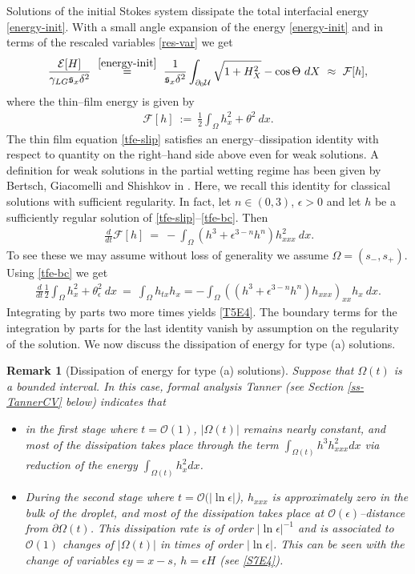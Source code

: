 \documentclass[pagesize,pdftex]{amsart}
\newtheorem{remark}[theorem]{Remark}
\newcommand{\p}{\partial}
\renewcommand{\d}{\delta}
\newcommand{\EE}{{\mathcal E}}
\newcommand{\FF}{{\mathcal F}}
\newcommand{\OO}{{\mathcal O}}
\newcommand{\UU}{{\mathcal U}}
\newcommand{\gam}{\gamma}
\newcommand{\eps}{\epsilon}
\newcommand{\ang}{\theta}
\newcommand{\Ome}{\Omega}
\newcommand{\ddt}{\, \frac{d}{dt}}
\newcommand{\lupref}[2]{\hspace{0ex} \stackrel{\eqref{#1}}{#2}} %
\newcommand{\LAM}{{\mathfrak s}}
\begin{document}
Solutions of the initial Stokes system dissipate the total interfacial energy
\eqref{energy-init}. With a small angle expansion of the energy
\eqref{energy-init} and in terms of the rescaled variables \eqref{res-var} we get
\begin{align}
  \frac{\EE[H]}{\gam_{LG} \LAM_x \d^2} \  %
  \lupref{energy-init} = \ \frac 1{\LAM_x\d^2} \int_{\p_0 \UU} \sqrt{%
  1+H_{X}^{2}} -\cos \Theta \ dX  \ %
  \approx  \
  \FF[h],
\end{align}
where the thin--film energy is given by
  \begin{align}
    \FF[h] \ := \ \frac 12  \int_{\Ome} h_x^2+ \ang^2 \ dx.
  \end{align}
  The thin film equation \eqref{tfe-slip} satisfies an energy--dissipation
  identity with respect to quantity on the right--hand side above even for weak
  solutions.  A definition for weak solutions in the partial wetting regime has
  been given by Bertsch, Giacomelli and Shishkov in
  \cite[Def. 3.1]{GiacomelliShishkov-2005}. Here, we recall this identity for
  classical solutions with sufficient regularity. In fact, let $n\in (0,3)$,
  $\eps > 0$ and let $h$ be a sufficiently regular solution of
  \eqref{tfe-slip}--\eqref{tfe-bc}.  Then
  \begin{align}
      \ddt \FF[h] \ = \ - \int_{\Ome} (h^3+ \eps^{3-n} h^{n}) h_{xxx}^2 \ dx. \label{T5E4}
  \end{align}
  To see these we may assume without loss of generality we assume $\Ome=(s_{-},s_{+})$. Using
  \eqref{tfe-bc} we get
\begin{align}
  \frac d{dt} \frac 12 \int_{\Ome} h_x^2 + \ang_\eps^2  \ dx   \ %
  = \ \int_{\Ome}h_{tx}h_x=-\int_{\Ome}((h^3+ \eps^{3-n} h^{n}) h_{xxx})_{xx}h_x \ dx.
\end{align}
Integrating by parts two more times yields \eqref{T5E4}. The boundary terms for
the integration by parts for the last identity vanish by assumption on the
regularity of the solution. We now discuss the dissipation of energy for type
(a) solutions.
\begin{remark}[Dissipation of energy for type (a) solutions] %
  Suppose that $\Ome (t)$ is a bounded interval. In this case, formal analysis
  Tanner (see Section \ref{ss-TannerCV} below) indicates that
  \begin{itemize}
  \item in the first stage where $t = \OO(1)$, $|\Ome (t) |$ remains nearly
    constant, and most of the dissipation takes place through the term
    $\int_{\Ome (t)}h^3h_{xxx}^2dx$ via reduction of the energy
    $\int_{\Ome (t)}h_x^2dx$.
      \item During the second stage where $t = \OO(|\ln \eps|$), $h_{xxx}$ is
        approximately zero in the bulk of the droplet, and most of the dissipation
        takes place at $\OO(\eps)$--distance from $\p \Ome (t)$. This dissipation rate
        is of order $|\ln \eps|^{-1}$ and is associated to $\OO(1)$ changes of
        $|\Ome (t)|$ in times of order $|\ln \eps|$. This can be seen with the change
        of variables $\eps y = x-s$, $h= \eps H$ (see \eqref{S7E4}).
      \end{itemize}
    \end{remark}
\end{document}
